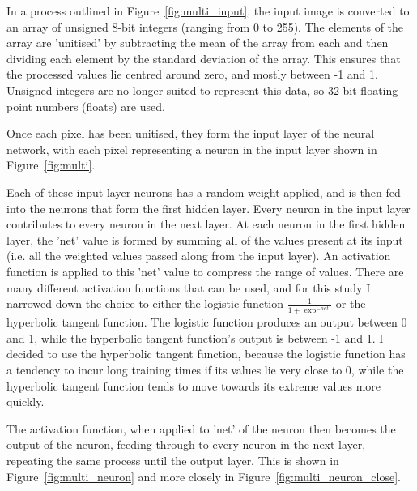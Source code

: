 
 In a process outlined in Figure~\ref{fig:multi_input}, the input image is converted to an array of unsigned 8-bit integers (ranging from 0 to 255). The elements of the array are 'unitised' by subtracting the mean of the array from each and then dividing each element by the standard deviation of the array. This ensures that the processed values lie centred around zero, and mostly between -1 and 1. Unsigned integers are no longer suited to represent this data, so 32-bit floating point numbers (floats) are used. %
 
 Once each pixel has been unitised, they form the input layer of the neural network, with each pixel representing a neuron in the input layer shown in Figure~\ref{fig:multi}. 
 
 Each of these input layer neurons has a random weight applied, and is then fed into the neurons that form the first hidden layer. Every neuron in the input layer contributes to every neuron in the next layer. At each neuron in the first hidden layer, the 'net' value is formed by summing all of the values present at its input (i.e. all the weighted values passed along from the input layer). An activation function is applied to this 'net' value to compress the range of values. There are many different activation functions that can be used, and for this study I narrowed down the choice to either the logistic function $ \frac{1}{1 + \exp^{-net}} $ or the hyperbolic tangent function. The logistic function produces an output between 0 and 1, while the hyperbolic tangent function's output is between -1 and 1. I decided to use the hyperbolic tangent function, because the logistic function has a tendency to incur long training times if its values lie very close to 0, while the hyperbolic tangent function tends to move towards its extreme values more quickly.  
 
 The activation function, when applied to 'net' of the neuron then becomes the output of the neuron, feeding through to every neuron in the next layer, repeating the same process until the output layer. This is shown in Figure~\ref{fig:multi_neuron} and more closely in Figure~\ref{fig:multi_neuron_close}.
 
